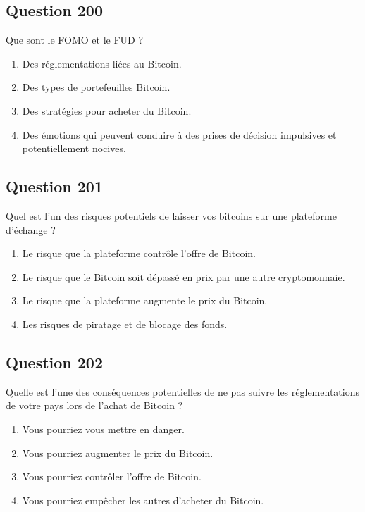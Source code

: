 \documentclass[12pt,a4paper]{article}
\begin{document}
\bigskip


\subsection*{Question 200}
Que sont le FOMO et le FUD ?

\begin{enumerate}[label=\Alph*., leftmargin=*]
\item Des réglementations liées au Bitcoin.
\item Des types de portefeuilles Bitcoin.
\item Des stratégies pour acheter du Bitcoin.
\item Des émotions qui peuvent conduire à des prises de décision impulsives et potentiellement nocives.
\end{enumerate}

\bigskip


\subsection*{Question 201}
Quel est l'un des risques potentiels de laisser vos bitcoins sur une plateforme d'échange ?

\begin{enumerate}[label=\Alph*., leftmargin=*]
\item Le risque que la plateforme contrôle l'offre de Bitcoin.
\item Le risque que le Bitcoin soit dépassé en prix par une autre cryptomonnaie.
\item Le risque que la plateforme augmente le prix du Bitcoin.
\item Les risques de piratage et de blocage des fonds.
\end{enumerate}

\bigskip


\subsection*{Question 202}
Quelle est l'une des conséquences potentielles de ne pas suivre les réglementations de votre pays lors de l'achat de Bitcoin ?

\begin{enumerate}[label=\Alph*., leftmargin=*]
\item Vous pourriez vous mettre en danger.
\item Vous pourriez augmenter le prix du Bitcoin.
\item Vous pourriez contrôler l'offre de Bitcoin.
\item Vous pourriez empêcher les autres d'acheter du Bitcoin.
\end{enumerate}
\end{document}
